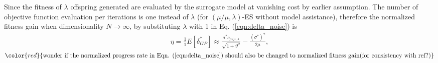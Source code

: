 

Since the fitness of $\lambda$ offspring generated are evaluated by the surrogate model at vanishing cost by earlier assumption. The number of objective function evaluation per iterations is one instead of $\lambda$ (for $(\mu/\mu,\lambda)$-ES without model assistance), therefore the normalized fitness gain when dimensionality $N \rightarrow \infty$, by substituting $\lambda$ with 1 in Eq. (\ref{eqn:delta_noise}) is 
\begin{align}\label{eqn:eta_surrogate}{}
\eta = \frac{1}{1}E[ \delta_{GP}^*] \approx  \frac{\sigma^* c_{\mu / \mu, \lambda}}{\sqrt {1+ \vartheta^2}} - \frac{(\sigma^*)^2}{2 \mu} ,
\end{align}
$\color{red}{\text{wonder if the normalized progress rate in Eqn. (\ref{eqn:delta_noise}) should also be changed to normalized fitness gain(for consistency with ref?)}}$


